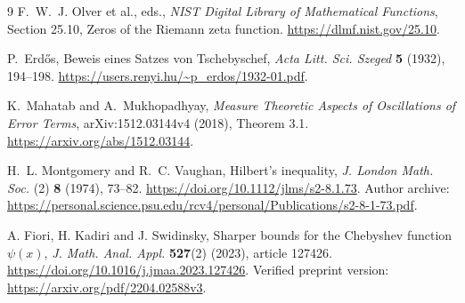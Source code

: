 \documentclass[11pt,a4paper]{article}
\theoremstyle{definition}
\theoremstyle{remark}
\begin{document}
\begin{thebibliography}{9}
F.~W.~J. Olver et al., eds.,
\emph{NIST Digital Library of Mathematical Functions},
Section 25.10, Zeros of the Riemann zeta function.
\url{https://dlmf.nist.gov/25.10}.

P.~Erd\H{o}s,
Beweis eines Satzes von Tschebyschef,
\emph{Acta Litt. Sci. Szeged} \textbf{5} (1932), 194--198.
\url{https://users.renyi.hu/~p_erdos/1932-01.pdf}.

K.~Mahatab and A.~Mukhopadhyay,
\emph{Measure Theoretic Aspects of Oscillations of Error Terms},
arXiv:1512.03144v4 (2018), Theorem 3.1.
\url{https://arxiv.org/abs/1512.03144}.

H.~L. Montgomery and R.~C. Vaughan,
Hilbert's inequality,
\emph{J. London Math. Soc.} (2) \textbf{8} (1974), 73--82.
\url{https://doi.org/10.1112/jlms/s2-8.1.73}.
Author archive:
\url{https://personal.science.psu.edu/rcv4/personal/Publications/s2-8-1-73.pdf}.

A. Fiori, H. Kadiri and J. Swidinsky,
Sharper bounds for the Chebyshev function \(\psi(x)\),
\emph{J. Math. Anal. Appl.} \textbf{527}(2) (2023), article 127426.
\url{https://doi.org/10.1016/j.jmaa.2023.127426}.
Verified preprint version:
\url{https://arxiv.org/pdf/2204.02588v3}.
\end{thebibliography}
\end{document}
